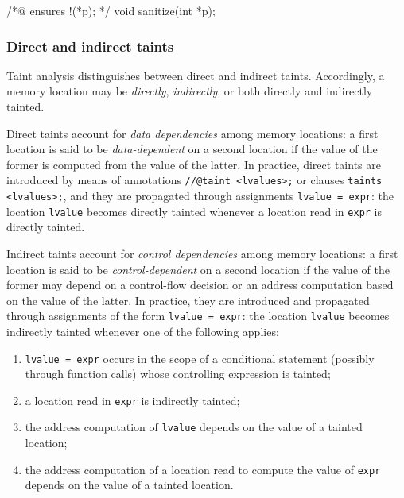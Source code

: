 \documentclass{frama-c-book}
\begin{document}
\begin{listing-nonumber}
  /*@ ensures !\tainted(*p); */
  void sanitize(int *p);
\end{listing-nonumber}

\subsubsection{Direct and indirect taints}
Taint analysis distinguishes between direct and indirect taints. Accordingly, a
memory location may be \emph{directly}, \emph{indirectly}, or both directly and
indirectly tainted.

Direct taints account for \emph{data dependencies} among memory locations: a
first location is said to be \emph{data-dependent} on a second location if the
value of the former is computed from the value of the latter.
In practice, direct taints are introduced by means of \acsl{} annotations
\lstinline|//@taint <lvalues>;| or clauses \lstinline|taints <lvalues>;|, and
they are propagated through assignments \lstinline|lvalue = expr|: the location
\lstinline|lvalue| becomes directly tainted whenever a location read in
\lstinline|expr| is directly tainted.

Indirect taints account for \emph{control dependencies} among memory locations:
a first location is said to be \emph{control-dependent} on a second location if
the value of the former may depend on a control-flow decision or an address
computation based on the value of the latter. In practice, they are introduced
and propagated through assignments of the form \lstinline|lvalue = expr|: the
location \lstinline|lvalue| becomes indirectly tainted whenever one of the
following applies:
\begin{enumerate}
  \item \lstinline|lvalue = expr| occurs in the scope of a conditional
  statement (possibly through function calls) whose controlling expression is
  tainted;
  \item a location read in \lstinline|expr| is indirectly tainted;
  \item the address computation of \lstinline|lvalue| depends on the value of
  a tainted location;
  \item the address computation of a location read to compute the value of
  \lstinline|expr| depends on the value of a tainted location.
\end{enumerate}
\end{document}

